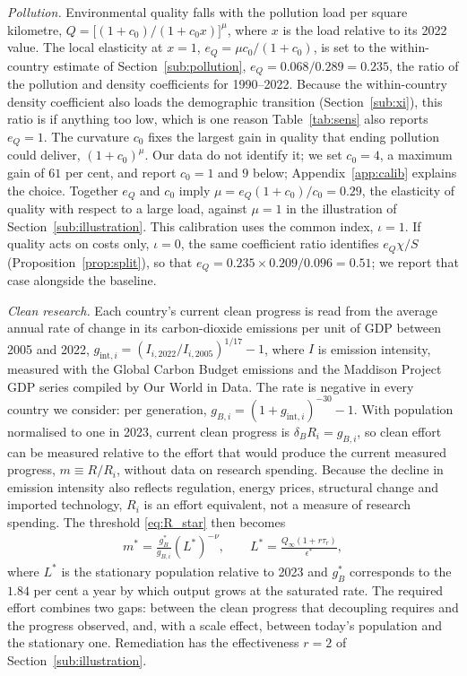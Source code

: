 \documentclass[11pt]{article}
\begin{document}
\emph{Pollution.} Environmental quality falls with the pollution load per square kilometre,
$Q=\big[(1+c_0)/(1+c_0x)\big]^{\mu}$, where $x$ is the load relative to its 2022 value. The local
elasticity at $x=1$, $e_Q=\mu c_0/(1+c_0)$, is set to the within-country estimate of
Section~\ref{sub:pollution}, $e_Q=0.068/0.289=0.235$, the ratio of the pollution and density
coefficients for 1990--2022. Because the within-country density coefficient also loads the demographic
transition (Section~\ref{sub:xi}), this ratio is if anything too low, which is one reason
Table~\ref{tab:sens} also reports $e_Q=1$. The curvature $c_0$ fixes the largest gain in quality that ending
pollution could deliver, $(1+c_0)^{\mu}$. Our data do not identify it; we set $c_0=4$, a maximum gain of
$61$ per cent, and report $c_0=1$ and $9$ below; Appendix~\ref{app:calib} explains the choice.
Together $e_Q$ and $c_0$ imply $\mu=e_Q(1+c_0)/c_0=0.29$, the elasticity of quality with respect to a
large load, against $\mu=1$ in the illustration of Section~\ref{sub:illustration}. This calibration uses the
common index, $\iota=1$. If quality acts on costs only, $\iota=0$, the same coefficient ratio identifies
$e_Q\chi/S$ (Proposition~\ref{prop:split}), so that $e_Q=0.235\times0.209/0.096=0.51$; we report that case
alongside the baseline.

\emph{Clean research.} Each country's current clean progress is read from the average annual rate of change in its
carbon-dioxide emissions per unit of GDP between 2005 and 2022,
$g_{\text{int},i}=(I_{i,2022}/I_{i,2005})^{1/17}-1$, where $I$ is emission intensity, measured with the
Global Carbon Budget emissions and the Maddison Project GDP series compiled by Our World in Data. The
rate is negative in every country we consider: per generation, $g_{B,i}=(1+g_{\text{int},i})^{-30}-1$. With population normalised to one in
2023, current clean progress is $\delta_BR_i=g_{B,i}$, so clean effort can be measured relative to the
effort that would produce the current measured progress, $m\equiv R/R_i$, without data on research
spending. Because the decline in emission intensity also reflects regulation, energy prices, structural
change and imported technology, $R_i$ is an effort equivalent, not a measure of research spending. The threshold \eqref{eq:R_star} then
becomes
\begin{align}
m^\ast=\frac{g_B^\ast}{g_{B,i}}\left(L^\ast\right)^{-\nu},
\qquad
L^\ast=\frac{Q_\infty(1+r\tau_r)}{\epsilon^\ast},
\label{eq:m_star}
\end{align}
where $L^\ast$ is the stationary population relative to 2023 and $g_B^\ast$ corresponds to the $1.84$ per
cent a year by which output grows at the saturated rate. The required effort combines two gaps: between
the clean progress that decoupling requires and the progress observed, and, with a scale effect, between
today's population and the stationary one. Remediation has the effectiveness $r=2$ of
Section~\ref{sub:illustration}.
\end{document}
